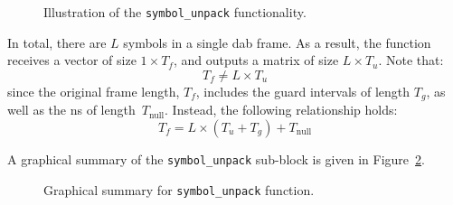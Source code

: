 \documentclass[class=report,11pt,crop=false]{standalone}
\begin{document}
\begin{figure}[htbp]
  \centering
  \captionsetup{type=figure}
  \def\svgwidth{\linewidth}
  { %
    \scriptsize
      }
  \caption{Illustration of the \texttt{symbol\_unpack} functionality.}
  \label{fig:symbols_unpack_illustration}
\end{figure}

In total, there are \(L\) symbols in a single \gls{dab} frame. As a result, the function receives a vector of size \(1\times T_f\), and outputs a matrix of size \(L\times T_u\). Note that:
\begin{equation}
  T_f \ne L\times T_u
\end{equation}
since the original frame length, \(T_f\), includes the guard intervals of length \(T_g\), as well as the \gls{ns} of length~\(T_\mathrm{null}\). Instead, the following relationship holds:
\begin{equation}
  T_f = L\times (T_u + T_g) + T_\mathrm{null}
\end{equation}

A graphical summary of the \texttt{symbol\_unpack} sub-block is given in Figure~\ref{fig:symbols_unpack}.

\begin{figure}[htbp]
  \centering
  \captionsetup{type=figure}
  \def\svgwidth{\linewidth}
  { %
      }
  \caption{Graphical summary for \texttt{symbol\_unpack} function.}
  \label{fig:symbols_unpack}
\end{figure}




\end{document}
